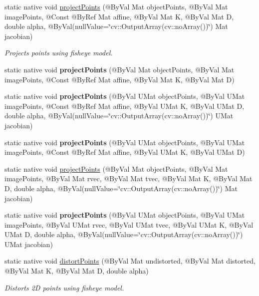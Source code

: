 \begin{DoxyCompactItemize}
\item 
static native void \hyperlink{group__calib3d__fisheye_gaf2fa76c626de207fce922dd3c2a1defc}{project\+Points} (@By\+Val Mat object\+Points, @By\+Val Mat image\+Points, @Const @By\+Ref Mat affine, @By\+Val Mat K, @By\+Val Mat D, double alpha, @By\+Val(null\+Value=\char`\"{}cv\+::\+Output\+Array(cv\+::no\+Array())\char`\"{}) Mat jacobian)
\begin{DoxyCompactList}\small\item\em Projects points using fisheye model. \end{DoxyCompactList}\item 
static native void {\bfseries project\+Points} (@By\+Val Mat object\+Points, @By\+Val Mat image\+Points, @Const @By\+Ref Mat affine, @By\+Val Mat K, @By\+Val Mat D)
\item 
static native void {\bfseries project\+Points} (@By\+Val U\+Mat object\+Points, @By\+Val U\+Mat image\+Points, @Const @By\+Ref Mat affine, @By\+Val U\+Mat K, @By\+Val U\+Mat D, double alpha, @By\+Val(null\+Value=\char`\"{}cv\+::\+Output\+Array(cv\+::no\+Array())\char`\"{}) U\+Mat jacobian)
\item 
static native void {\bfseries project\+Points} (@By\+Val U\+Mat object\+Points, @By\+Val U\+Mat image\+Points, @Const @By\+Ref Mat affine, @By\+Val U\+Mat K, @By\+Val U\+Mat D)
\item 
static native void \hyperlink{group__calib3d__fisheye_ga01c2fc60a861f2b9972e00c4837a315b}{project\+Points} (@By\+Val Mat object\+Points, @By\+Val Mat image\+Points, @By\+Val Mat rvec, @By\+Val Mat tvec, @By\+Val Mat K, @By\+Val Mat D, double alpha, @By\+Val(null\+Value=\char`\"{}cv\+::\+Output\+Array(cv\+::no\+Array())\char`\"{}) Mat jacobian)
\item 
static native void {\bfseries project\+Points} (@By\+Val U\+Mat object\+Points, @By\+Val U\+Mat image\+Points, @By\+Val U\+Mat rvec, @By\+Val U\+Mat tvec, @By\+Val U\+Mat K, @By\+Val U\+Mat D, double alpha, @By\+Val(null\+Value=\char`\"{}cv\+::\+Output\+Array(cv\+::no\+Array())\char`\"{}) U\+Mat jacobian)
\item 
static native void \hyperlink{group__calib3d__fisheye_gacc047f2a04ea647d5dd504de5b1b6ba3}{distort\+Points} (@By\+Val Mat undistorted, @By\+Val Mat distorted, @By\+Val Mat K, @By\+Val Mat D, double alpha)
\begin{DoxyCompactList}\small\item\em Distorts 2D points using fisheye model. \end{DoxyCompactList}\item 

\end{DoxyCompactItemize}
